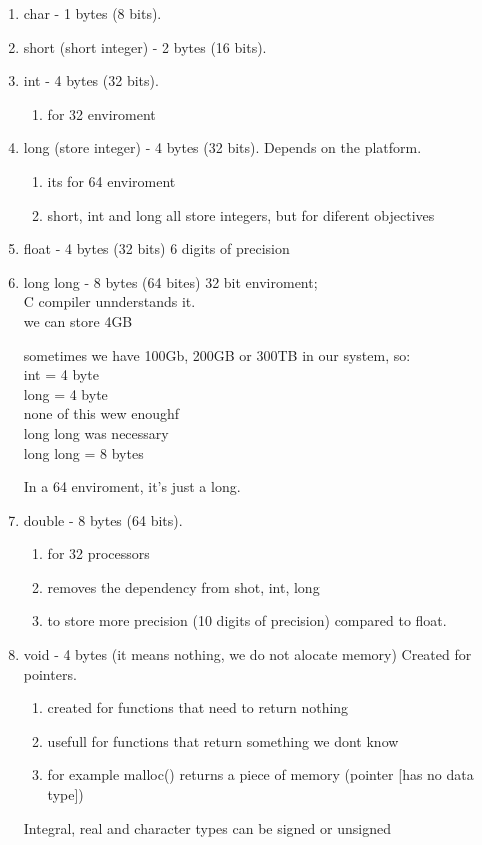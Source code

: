 \documentclass[12pt]{article}
\begin{document}
\begin{enumerate}
	\item char - 1 bytes (8 bits).

	\item short (short integer) - 2 bytes (16 bits).

	\item int - 4 bytes (32 bits).
		\begin{enumerate}
			\item for 32 enviroment
		\end{enumerate}

	\item long (store integer) - 4 bytes (32 bits). Depends on the platform.
		\begin{enumerate}
			\item its for 64 enviroment
			\item short, int and long all store integers, but for diferent objectives
		\end{enumerate}
	\item float - 4 bytes (32 bits) 6 digits of precision

	\item long long - 8 bytes (64 bites)
		32 bit enviroment;\\
		C compiler unnderstands it.\\
		we can store 4GB

		sometimes we have 100Gb, 200GB or 300TB in our system, so:\\
		int = 4 byte\\
		long = 4 byte\\
		none of this wew enoughf\\
		long long was necessary\\
		long long = 8 bytes

		In a 64 enviroment, it's just a long.
	\item double - 8 bytes (64 bits).
		\begin{enumerate}
			\item for 32 processors
			\item removes the dependency from shot, int, long
			\item to store more precision (10 digits of precision) compared to float.
		\end{enumerate}

	\item void - 4 bytes (it means nothing, we do not alocate memory)
		Created for pointers.
		\begin{enumerate}
			\item created for functions that need to return nothing
			\item usefull for functions that return something we dont know
			\item for example malloc() returns a piece of memory (pointer [has no data type])
		\end{enumerate}
		Integral, real and character types can be signed or unsigned


\end{enumerate}
\end{document}
